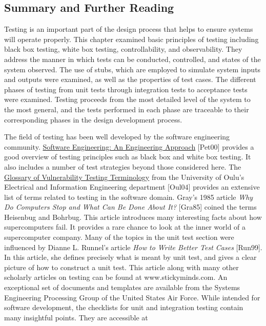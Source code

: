 \subsection{Summary and Further
Reading}\label{summary-and-further-reading}

Testing is an important part of the design process that helps to ensure
systems will operate properly. This chapter examined basic principles of
testing including black box testing, white box testing, controllability,
and observability. They address the manner in which tests can be
conducted, controlled, and states of the system observed. The use of
stubs, which are employed to simulate system inputs and outputs were
examined, as well as the properties of test cases. The different phases
of testing from unit tests through integration tests to acceptance tests
were examined. Testing proceeds from the most detailed level of the
system to the most general, and the tests performed in each phase are
traceable to their corresponding phases in the design development
process.

The field of testing has been well developed by the software engineering
community. \ul{Software Engineering: An Engineering Approach}
{[}Pet00{]} provides a good overview of testing principles such as black
box and white box testing. It also includes a number of test strategies
beyond those considered here. The \ul{Glossary of Vulnerability Testing
Terminology} from the University of Oulu's Electrical and Information
Engineering department {[}Oul04{]} provides an extensive list of terms
related to testing in the software domain. Gray's 1985 article \emph{Why
Do Computers Stop and What Can Be Done About It?} {[}Gra85{]} coined the
terms Heisenbug and Bohrbug. This article introduces many interesting
facts about how supercomputers fail. It provides a rare chance to look
at the inner world of a supercomputer company. Many of the topics in the
unit test section were influenced by Dianne L. Runnel's article
\emph{How to Write Better Test Cases} {[}Run99{]}. In this article, she
defines precisely what is meant by unit test, and gives a clear picture
of how to construct a unit test. This article along with many other
scholarly articles on testing can be found at www.stickyminds.com. An
exceptional set of documents and templates are available from the
Systems Engineering Processing Group of the United States Air Force.
While intended for software development, the checklists for unit and
integration testing contain many insightful points. They are accessible
at

